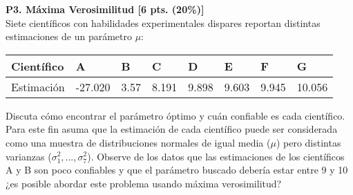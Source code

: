 \documentclass[letterpaper,11pt]{article}
\theoremstyle{plain}
\theoremstyle{definition}
\newcommand{\1}{\mathbbm{1}}
\begin{document}


\textbf{P3. Máxima Verosimilitud  [6 pts. (20\%)]} \\

Siete científicos con habilidades experimentales  dispares reportan distintas estimaciones de un parámetro $\mu$:

\begin{table}[H]
\centering
\begin{tabular}{llllllll}
Científico & A       & B    & C     & D     & E     & F     & G      \\ \hline
Estimación & -27.020 & 3.57 & 8.191 & 9.898 & 9.603 & 9.945 & 10.056
\end{tabular}
\end{table}


Discuta cómo encontrar el parámetro óptimo y cuán confiable es cada científico. Para este fin asuma que la estimación de cada científico puede ser considerada como una muestra de distribuciones normales de igual media ($\mu$) pero distintas varianzas ($\sigma_1^2,...,\sigma_7^2$). Observe de los datos que las estimaciones de los científicos A y B son poco confiables y que el parámetro buscado debería estar entre 9 y 10 ¿es posible abordar este problema usando máxima verosimilitud?
\end{document}
